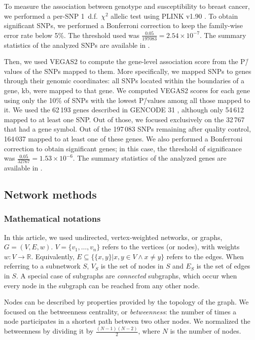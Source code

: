 \documentclass[10pt,letterpaper]{article}
\begin{document}
To measure the association between genotype and susceptibility to breast cancer, we performed a per-SNP 1~d.f.~$\chi^2$ allelic test using PLINK v1.90 \cite{chang_second-generation_2015}. To obtain significant SNPs, we performed a Bonferroni correction to keep the family-wise error rate below 5\%. The threshold used was $\frac {0.05} {197083} = 2.54 \times 10^{-7}$. The summary statistics of the analyzed SNPs are available in .

Then, we used VEGAS2 \cite{mishra_vegas2:_2015} to compute the gene-level association score from the P\=/values of the SNPs mapped to them. More specifically, we mapped SNPs to genes through their genomic coordinates: all SNPs located within the boundaries of a gene,  kb, were mapped to that gene. We computed VEGAS2 scores for each gene using only the 10\% of SNPs with the lowest P\=/values among all those mapped to it. We used the 62\,193 genes described in GENCODE 31 \cite{frankish_gencode_2019}, although only 54\,612 mapped to at least one SNP. Out of those, we focused exclusively on the 32\,767 that had a gene symbol. Out of the 197\,083 SNPs remaining after quality control, 164\,037 mapped to at least one of these genes. We also performed a Bonferroni correction to obtain significant genes; in this case, the threshold of significance was $\frac {0.05} {32767} = 1.53 \times 10^{-6}$. The summary statistics of the analyzed genes are available in .

\subsection{Network methods}

\subsubsection{Mathematical notations}
\label{methods:notation}
In this article, we used undirected, vertex-weighted networks, or graphs, $G = (V,E,w)$. $V = \{v_{1}, \dots{}, v_{n}\}$ refers to the vertices (or nodes), with weights $w: V \rightarrow \mathbb{R}$. Equivalently, $E \subseteq \{\{x,y\} | x,y \in V \wedge x \neq y\}$ refers to the edges. When referring to a subnetwork $S$, $V_{S}$ is the set of nodes in $S$ and $E_{S}$ is the set of edges in $S$. A special case of subgraphs are \emph{connected} subgraphs, which occur when every node in the subgraph can be reached from any other node.

Nodes can be described by properties provided by the topology of the graph. We focused on the betweenness centrality, or \emph{betweenness}: the number of times a node participates in a shortest path between two other nodes. We normalized the betweenness by dividing it by $\frac {(N-1)(N-2)} {2}$, where $N$ is the number of nodes.
\end{document}
